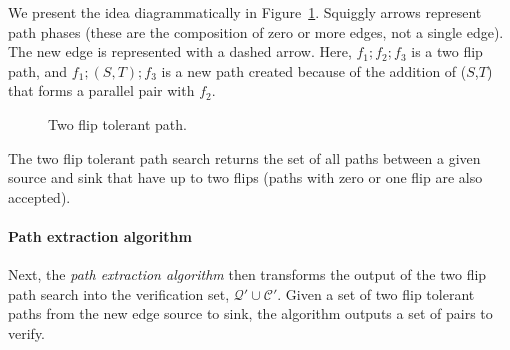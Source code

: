 \documentclass[sigplan]{acmart}
\begin{document}
We present the idea diagrammatically in Figure~\ref{figure_two_flip}.
Squiggly arrows represent path phases (these are the composition of zero or more edges, not a single edge).
The new edge is represented with a dashed arrow.
Here, $f_1 ; f_2 ; f_3$ is a two flip path, and $f_1 ; (S, T) ; f_3$ is a new path created because of the addition of ($S$,$T$) that forms a parallel pair with $f_2$.

\begin{figure}
\begin{center}
\end{center}
\caption{Two flip tolerant path.}
\label{figure_two_flip}
\end{figure}

The two flip tolerant path search returns the set of all paths between a given source and sink that have up to two flips (paths with zero or one flip are also accepted).

\paragraph{Path extraction algorithm}
Next, the \textit{path extraction algorithm} then transforms the output of the two flip path search into the verification set, $\mathcal{Q}' \cup \mathcal{C}'$.
Given a set of two flip tolerant paths from the new edge source to sink, the algorithm outputs a set of pairs to verify.
\end{document}
